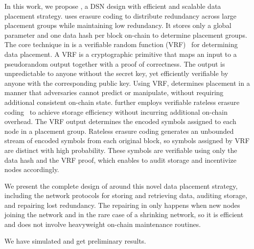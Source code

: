 In this work, we propose \sys, a DSN design with efficient and scalable data placement strategy.
\sys uses erasure coding to distribute redundancy across large placement groups while maintaining low redundancy.
It stores only a global parameter and one data hash per block on-chain to determine placement groups.
The core technique in \sys is a verifiable random function (VRF)~\cite{vrf,vrf-rfc} for determining data placement.
A VRF is a cryptographic primitive that maps an input to a pseudorandom output together with a proof of correctness.
The output is unpredictable to anyone without the secret key, yet efficiently verifiable by anyone with the corresponding public key.
Using VRF, \sys determines placement in a manner that adversaries cannot predict or manipulate, without requiring additional consistent on-chain state.
\sys further employs verifiable rateless erasure coding~\cite{verify-rateless-ec} to achieve storage efficiency without incurring additional on-chain overhead.
The VRF output determines the encoded symbols assigned to each node in a placement group.
Rateless erasure coding generates an unbounded stream of encoded symbols from each original block, so symbols assigned by VRF are distinct with high probability.
These symbols are verifiable using only the data hash and the VRF proof, which enables \sys to audit storage and incentivize nodes accordingly.

We present the complete design of \sys around this novel data placement strategy, including the network protocols for storing and retrieving data, auditing storage, and repairing lost redundancy.
The repairing in \sys only happens when new nodes joining the network and in the rare case of a shrinking network, so it is efficient and does not involve heavyweight on-chain maintenance routines.

We have simulated \sys and get preliminary results.
